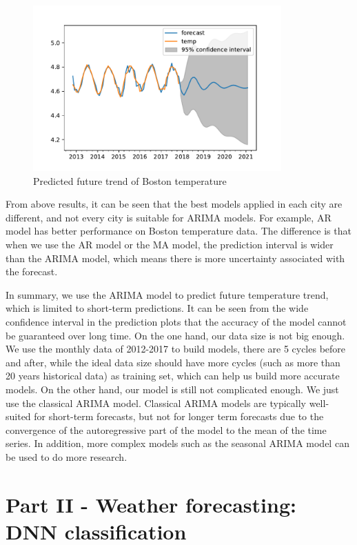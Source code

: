 \documentclass[runningheads]{llncs}
\begin{document}
\begin{figure}
    \centering
    \includegraphics[height=2.5in]{Boston-pred.pdf}
    \caption{Predicted future trend of Boston temperature}\label{boston-pred}
\end{figure}

From above results, it can be seen that the best models applied in each city are different, and not every city is suitable for ARIMA models. For example, AR model has better performance on Boston temperature data. The difference is that when we use the AR model or the MA model, the prediction interval is wider than the ARIMA model, which means there is more uncertainty associated with the forecast.

In summary, we use the ARIMA model to predict future temperature trend, which is limited to short-term predictions. It can be seen from the wide confidence interval in the prediction plots that the accuracy of the model cannot be guaranteed over long time. On the one hand, our data size is not big enough. We use the monthly data of 2012-2017 to build models, there are 5 cycles before and after, while the ideal data size should have more cycles (such as more than 20 years historical data) as training set, which can help us build more accurate models. On the other hand, our model is still not complicated enough. We just use the classical ARIMA model. Classical ARIMA models are typically well-suited for short-term forecasts, but not for longer term forecasts due to the convergence of the autoregressive part of the model to the mean of the time series. In addition, more complex models such as the seasonal ARIMA model can be used to do more research.

\section{Part II - Weather forecasting: DNN classification}
\end{document}
